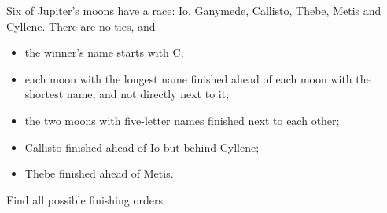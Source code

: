 Six of Jupiter's moons have a race: Io, Ganymede, Callisto, Thebe, Metis and Cyllene. There are no ties, and
\begin{itemize}
\item the winner's name starts with C;
\item each moon with the longest name finished ahead of each moon with the shortest name, and not directly next to it;
\item the two moons with five-letter names finished next to each other;
\item Callisto finished ahead of Io but behind Cyllene;
\item Thebe finished ahead of Metis.
\end{itemize}
Find all possible finishing orders.
